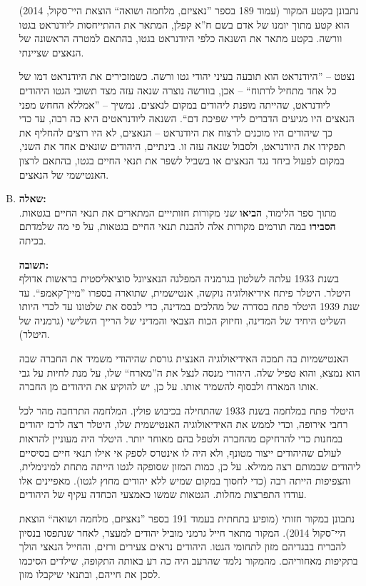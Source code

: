 \documentclass[a4paper]{article}
\begin{document}
\begin{enumerate}[A.]
			נתבונן בקטע המקור (עמוד 189 בספר ''נאציזם, מלחמה ושואה`` הוצאת היי־סקול, 2014) הוא קטע מתוך יומנו של אדם בשם ח''א קפלן, המתאר את ההתייחסות ליודנראט בגטו וורשה. בקטע מתאר את השנאה כלפי היודנראט בגטו, בהתאם למטרה הראשונה של הנאצים שציינתי. 
			
			נצטט – ''היודנראט הוא תובעה בעיני יהודי גטו ורשה. כשמזכירים את היודנראט דמו של כל אחד מתחיל לרתוח`` – אכן, בוורשה נוצרה שנאה עזה מצד תשובי הגטו היהודים ליודנראט, שהייתה מופנת ליהודים במקום לנאצים. נמשיך – ''אמללא החחש מפני הנאצים היו מגיעים הדברים לידי שפיכת דם``. השנאה ליודנראטים היא כה רבה, עד כדי כך שיהודים היו מוכנים לרצוח את היודנראט – הנאצים, לא היו רוצים להחליף את תפקידו את היודנראט, ולסבול שנאה עזה זו. בינתיים, היהודים שונאים אחד את השני, במקום לפעול ביחד נגד הנאצים או בשביל לשפר את תנאי החיים בגטו, בהתאם לרצון האנטישמי של הנאצים. 
			\item \textbf{שאלה: }\\
			מתוך ספר הלימוד, \textbf{הביאו} \textit{שני} מקורות חזותייים המתארים את תנאי החיים בגטאות. \textbf{הסבירו} במה תורמים מקורות אלה להבנת תנאי החיים בגטאות, על פי מה שלמדתם בכיתה. 
			
			\textbf{תשובה: }\\
			בשנת 1933 עלתה לשלטון בגרמניה המפלגה הנאציונל סוציאליסטית בראשות אדולף היטלר. היטלר פיתח אידיאולוגיה נוקשה, אנטישמית, שתוארה בספרו ''מיין־קאמפ``. עד שנת 1939 היטלר פתח בסדרה של מהלכים במדינה, כדי לבסס את שלטונו עד לכדי היותו השליט היחיד של המדינה, וחיזוק הכוח הצבאי והמדיני של הרייך השלישי (גרמניה של היטלר). 
			
			האנטישמיות בה תמכה האידיאולוגיה האנצית גורסת שהיהודי משמיד את החברה שבה הוא נמצא, והוא טפיל שלה. היהודי מנסה לנצל את ה''מארח`` שלו, על מנת לחיות על גבי אותו המארח ולבסוף להשמיד אותו. על כן, יש להוקיע את היהודים מן החברה. 
			
			היטלר פתח במלחמה בשנת 1933 שהתחילה בכיבוש פולין. המלחמה התרחבה מהר לכל רחבי אירופה, וכדי לממש את האידיאולוגיה האנטישמית שלו, היטלר רצה לרכז יהודים במחנות כדי להרחיקם מהחברה ולטפל בהם מאוחר יותר. היטלר היה מעוניין להראות לעולם שהיהודים ייצור מטונף, ולא היה לו אינטרס לספק אי אילו תנאי חיים בסיסיים ליהודים שבמותם רצה ממילא. על כן, כמות המזון שסופקה לגטו הייתה מתחת למינימלית, והצפיפות הייתה רבה (כדי לחסוך במקום שמיש ללא יהודים מחוץ לגטו). מאפיינים אלו עודדו התפרצות מחלות. הגטאות שמשו כאמצעי הכחדה עקיף של היהודים. 
			
			נתבונן במקור חזותי (מופיע בתחתית בעמוד 191 בספר ''נאציזם, מלחמה ושואה`` הוצאת היי־סקול 2014). המקור מתאר חייל גרמני מוביל יהודים למעצר, לאחר שנתפסו בנסיון להבריח בבגדיהם מזון לתחומי הגטו. היהודים נראים צעירים ורזים, והחייל הנאצי הולך בתקיפות מאחוריהם. מהמקור נלמד שהרעב היה כה רע באותה התקופה, שילדים הסיכמו לסכן את חייהם, ובתנאי שיקבלו מזון. 
			

\end{enumerate}
\end{document}
